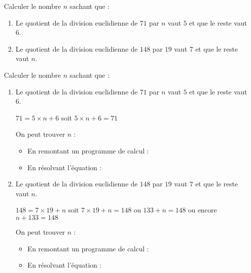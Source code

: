 \begin{exercice*}
    Calculer le nombre $n$ sachant que :
    \begin{enumerate}
            \item Le quotient de la division euclidienne de $71$ par $n$ vaut $5$ et que le reste vaut $6$.
            \item Le quotient de la division euclidienne de $148$ par $19$ vaut $7$ et que le reste vaut $n$.            
    \end{enumerate}
\end{exercice*}
\begin{corrige}
    Calculer le nombre $n$ sachant que :

    \begin{enumerate}
            \item Le quotient de la division euclidienne de $71$ par $n$ vaut $5$ et que le reste vaut $6$.
            
            $71 = 5\times n + 6$ soit $5\times n + 6 =71$
            
            On peut trouver $n$ :
            \begin{itemize}
                \item En remontant un programme de calcul : 
                

                
                \item En résolvant l'équation :
            \end{itemize}
            \item Le quotient de la division euclidienne de $148$ par $19$ vaut $7$ et que le reste vaut $n$.            
            
            $148 = 7\times 19 + n$ soit $7\times 19 + n = 148$ ou $133+n=148$ ou encore $n+133=148$

            On peut trouver $n$ :
            \begin{itemize}
                \item En remontant un programme de calcul : 
                

                
                \item En résolvant l'équation :
            \end{itemize}

    \end{enumerate}
\end{corrige}

